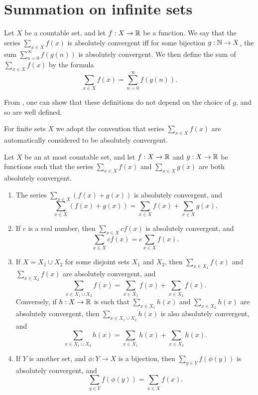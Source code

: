 \section{Summation on infinite sets}\label{i:sec:8.2}

\begin{defn}\label{i:8.2.1}
  Let \(X\) be a countable set, and let \(f : X \to \mathbb{R}\) be a function.
  We say that the series \(\sum_{x \in X} f(x)\) is absolutely convergent iff for some bijection \(g : \mathbb{N} \to X\), the sum \(\sum_{n = 0}^\infty f(g(n))\) is absolutely convergent.
  We then define the sum of \(\sum_{x \in X} f(x)\) by the formula
  \[
    \sum_{x \in X} f(x) = \sum_{n = 0}^\infty f(g(n)).
  \]
\end{defn}

\begin{note}
  From , one can show that these definitions do not depend on the choice of \(g\), and so are well defined.
\end{note}

\begin{note}
  For finite sets \(X\) we adopt the convention that series \(\sum_{x \in X} f(x)\) are automatically considered to be absolutely convergent.
\end{note}

\begin{ac}\label{i:ac:8.2.1}
  Let \(X\) be an at most countable set, and let \(f : X \to \mathbb{R}\) and \(g : X \to \mathbb{R}\) be functions such that the series \(\sum_{x \in X} f(x)\) and \(\sum_{x \in X} g(x)\) are both absolutely convergent.
  \begin{enumerate}
    \item\label{i:ac:8.2.1.a} The series \(\sum_{x \in X} (f(x) + g(x))\) is absolutely convergent, and
    \[
      \sum_{x \in X} (f(x) + g(x)) = \sum_{x \in X} f(x) + \sum_{x \in X} g(x).
    \]
    \item\label{i:ac:8.2.1.b} If \(c\) is a real number, then \(\sum_{x \in X} cf(x)\) is absolutely convergent, and
    \[
      \sum_{x \in X} cf(x) = c \sum_{x \in X} f(x).
    \]
    \item\label{i:ac:8.2.1.c} If \(X = X_1 \cup X_2\) for some disjoint sets \(X_1\) and \(X_2\), then \(\sum_{x \in X_1} f(x)\) and \\
    \(\sum_{x \in X_2} f(x)\) are absolutely convergent, and
    \[
      \sum_{x \in X_1 \cup X_2} f(x) = \sum_{x \in X_1} f(x) + \sum_{x \in X_2} f(x).
    \]
    Conversely, if \(h : X \to \mathbb{R}\) is such that \(\sum_{x \in X_1} h(x)\) and \(\sum_{x \in X_2} h(x)\) are absolutely convergent, then \(\sum_{x \in X_1 \cup X_2} h(x)\) is also absolutely convergent, and
    \[
      \sum_{x \in X_1 \cup X_2} h(x) = \sum_{x \in X_1} h(x) + \sum_{x \in X_2} h(x).
    \]
    \item\label{i:ac:8.2.1.d} If \(Y\) is another set, and \(\phi : Y \to X\) is a bijection, then \(\sum_{y \in Y} f(\phi(y))\) is absolutely convergent, and
    \[
      \sum_{y \in Y} f(\phi(y)) = \sum_{x \in X} f(x).
    \]
  \end{enumerate}
\end{ac}

